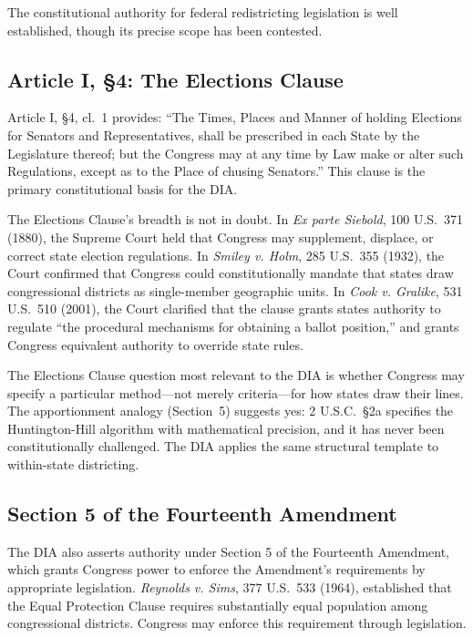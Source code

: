 The constitutional authority for federal redistricting legislation is well established, though its precise scope has been contested.

\subsection{Article I, \S4: The Elections Clause}

Article I, \S4, cl.\ 1 provides: ``The Times, Places and Manner of holding Elections for Senators and Representatives, shall be prescribed in each State by the Legislature thereof; but the Congress may at any time by Law make or alter such Regulations, except as to the Place of chusing Senators.'' This clause is the primary constitutional basis for the DIA.

The Elections Clause's breadth is not in doubt. In \textit{Ex parte Siebold}, 100 U.S.\ 371 (1880), the Supreme Court held that Congress may supplement, displace, or correct state election regulations. In \textit{Smiley v. Holm}, 285 U.S.\ 355 (1932), the Court confirmed that Congress could constitutionally mandate that states draw congressional districts as single-member geographic units. In \textit{Cook v. Gralike}, 531 U.S.\ 510 (2001), the Court clarified that the clause grants states authority to regulate ``the procedural mechanisms for obtaining a ballot position,'' and grants Congress equivalent authority to override state rules.

The Elections Clause question most relevant to the DIA is whether Congress may specify a particular method---not merely criteria---for how states draw their lines. The apportionment analogy (Section~5) suggests yes: 2 U.S.C.\ \S2a specifies the Huntington-Hill algorithm with mathematical precision, and it has never been constitutionally challenged. The DIA applies the same structural template to within-state districting.

\subsection{Section 5 of the Fourteenth Amendment}

The DIA also asserts authority under Section 5 of the Fourteenth Amendment, which grants Congress power to enforce the Amendment's requirements by appropriate legislation. \textit{Reynolds v. Sims}, 377 U.S.\ 533 (1964), established that the Equal Protection Clause requires substantially equal population among congressional districts. Congress may enforce this requirement through legislation.

